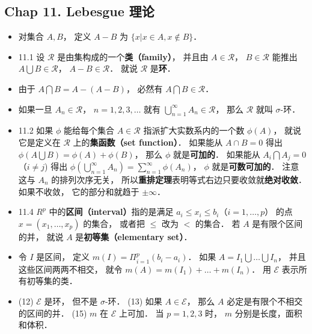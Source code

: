 \subsection{Chap 11. Lebesgue 理论}

\begin{itemize}
\item 对集合 $A, B$， 定义 $A-B$ 为 $\{x|x\in A, x\notin B\}$．

\item 11.1 设 $\mathscr R$ 是由集构成的一个\textbf{类（family）}， 并且由 $A\in \mathscr R$， $B\in \mathscr R$ 能推出 $A\bigcup B\in \mathscr R$， $A- B\in \mathscr R$． 就说 $\mathscr R$ 是\textbf{环}．

\item 由于 $A\bigcap B=A-(A-B)$， 必然有 $A\bigcap B\in \mathscr R$．

\item 如果一旦 $A_n\in \mathscr R$， $n=1,2,3,\dots$ 就有 $\bigcup_{n=1}^\infty A_n \in \mathscr R$， 那么 $\mathscr R$ 就叫 $\sigma$-环．

\item 11.2 如果 $\phi$ 能给每个集合 $A\in \mathscr R$ 指派扩大实数系内的一个数 $\phi(A)$， 就说它是定义在 $\mathscr R$ 上的\textbf{集函数（set function）}． 如果能从 $A\cap B=0$ 得出 $\phi(A\bigcup B)=\phi(A)+\phi(B)$， 那么 $\phi$ 就是\textbf{可加的}． 如果能从 $A_i\bigcap A_j = 0$ （$i\ne j$) 得出 $\phi(\bigcup_{n=1}^\infty A_n) = \sum_{n=1}^\infty \phi(A_n)$， $\phi$ 就是\textbf{可数可加的}． 注意这与 $A_n$ 的排列次序无关， 所以\textbf{重排定理}表明等式右边只要收敛就\textbf{绝对收敛}． 如果不收敛， 它的部分和就趋于 $\pm\infty$．

\item 11.4 $R^p$ 中的\textbf{区间（interval）}指的是满足 $a_i\leqslant x_i\leqslant b_i$（$i=1,\dots,p$） 的点 $x=(x_1,\dots,x_p)$ 的集合， 或者把 $\leqslant$ 改为 $<$ 的集合． 若 $A$ 是有限个区间的并， 就说 $A$ 是\textbf{初等集（elementary set）}．

\item 令 $I$ 是区间， 定义 $m(I)=\Pi_{i=1}^p (b_i-a_i)$． 如果 $A=I_1\bigcup \dots \bigcup I_n$， 并且这些区间两两不相交， 就令 $m(A)=m(I_1)+\dots+m(I_n)$． 用 $\mathscr E$ 表示所有初等集的类．

\item (12) $\mathscr E$ 是环， 但不是 $\sigma$-环． (13) 如果 $A\in \mathscr E$， 那么 $A$ 必定是有限个不相交的区间的并． (15) $m$ 在 $\mathscr E$ 上可加． 当 $p=1,2,3$ 时， $m$ 分别是长度，面积和体积．


\end{itemize}
